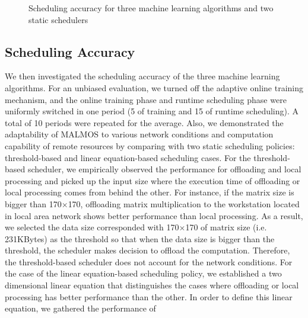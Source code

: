 \documentclass[10pt, conference, compsocconf]{IEEEtran}
\begin{document}
{{\begin{figure}[ht]
{}
\centering
{}
\caption{Scheduling accuracy for three machine learning algorithms and
two static schedulers}
\end{figure}
%
\subsection{Scheduling Accuracy}
%
We then investigated the scheduling accuracy of the three machine learning
algorithms.
%
For an unbiased evaluation, we turned off the adaptive online training
mechanism, and the online training phase and runtime scheduling phase were
uniformly switched in one period (5 of training and 15 of runtime
scheduling).
%
A total of 10 periods were repeated for the average.
%
Also, we demonstrated the adaptability of MALMOS to various network
conditions and computation capability of remote resources by comparing
with two static scheduling policies: threshold-based and linear
equation-based scheduling cases.
%
For the threshold-based scheduler, we empirically observed the
performance for offloading and local processing and picked up the input
size where the execution time of offloading or local processing comes from
behind the other.
%
For instance, if the matrix size is bigger than 170$\times$170,
offloading matrix multiplication to the workstation located in local
area network shows better performance than local processing.
%
As a result, we selected the data size corresponded with 170$\times$170 of matrix
size (i.e. 231KBytes) as the threshold so that when the data size is bigger than the
threshold, the scheduler makes decision to offload the computation.   
%
Therefore, the threshold-based scheduler does not account for the network
conditions.
%
For the case of the linear equation-based scheduling policy, we
established a two dimensional linear equation that distinguishes the
cases where offloading or local processing has better performance than
the other.
%
In order to define this linear equation, we gathered the performance of
}}
\end{document}
